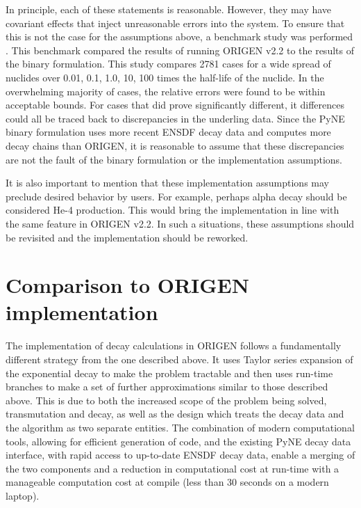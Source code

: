 \documentclass{anstrans}
\begin{document}
In principle, each of these statements is reasonable. However, they may 
have covariant effects that inject unreasonable errors into the system.
To ensure that this is not the case for the assumptions above, 
a benchmark study was performed \cite{benchmark}. This benchmark compared
the results of running ORIGEN v2.2 \cite{croff1980origen2} to the results of 
the binary formulation. This study compares 2781 cases for a wide spread of
nuclides over 0.01, 0.1, 1.0, 10, 100 times the half-life of the nuclide.
In the overwhelming majority of cases, the relative errors were found to be 
within acceptable bounds.  For cases that did prove significantly different, 
it differences could all be traced back to discrepancies in the underling 
data. Since the PyNE binary formulation uses more recent ENSDF decay 
data \cite{bhat1992evaluated} and computes more decay chains than ORIGEN, 
it is reasonable to assume that these discrepancies are not the fault of the 
binary formulation or the implementation assumptions.

It is also important to mention that these implementation assumptions 
may preclude desired behavior by users. For example, perhaps alpha decay 
should be considered He-4 production. This would bring the implementation in
line with the same feature in ORIGEN v2.2. In such a situations, these 
assumptions should be revisited and the implementation should be reworked.

\section{Comparison to ORIGEN implementation}

The implementation of decay calculations in ORIGEN follows a fundamentally 
different strategy from the one described above. It uses Taylor series expansion 
of the exponential decay to make the problem tractable
and then uses run-time branches to make a set of further approximations similar
to those described above. This is due to both the increased scope of the 
problem being solved, transmutation and decay, as well as the design which
treats the decay data and the algorithm as two separate entities. The 
combination of modern computational tools, allowing for efficient generation of 
code, and the existing PyNE decay data interface, with rapid access to up-to-date ENSDF
decay data, enable a merging of the two components and a reduction in computational
cost at run-time with a manageable computation cost at compile (less than 30 seconds on
a modern laptop). 
\end{document}
